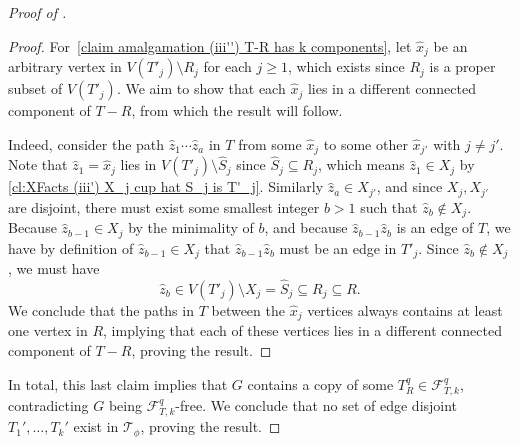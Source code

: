 \documentclass[12pt,letterpaper]{article}
\theoremstyle{definition}
\newcommand{\pow}{q} %
\renewcommand{\c}[1]{\mathcal{#1}}
\newcommand{\sm}{\setminus}
\newcommand{\sub}{\subseteq}
\begin{document}
\begin{proof}[Proof of ]
\begin{proof}
			For~\ref{claim amalgamation (iii'') T-R has k components}, let $\hat{x}_j$ be an arbitrary vertex in $V(T'_j)\sm R_j$ for each $j\ge 1$, which exists since $R_j$ is a proper subset of $V(T'_j)$.  We aim to show that each $\hat{x}_j$ lies in a different connected component of $T-R$, from which the result will follow.  
			
			Indeed, consider the path $\hat{z}_1\cdots \hat{z}_a$ in $T$ from some $\hat{x}_j$ to some other $\hat{x}_{j'}$ with $j\ne j'$.  Note that $\hat{z}_1=\hat{x}_j$ lies in $V(T'_j)\sm \widehat{S}_j$ since $\widehat{S}_j\sub R_j$, which means $\hat{z}_1\in X_j$ by \ref{cl:XFacts (iii') X_j cup hat S_j is T'_j}.  Similarly $\hat{z}_a\in X_{j'}$, and since $X_j,X_{j'}$ are disjoint, there must exist some smallest integer $b>1$ such that $\hat{z}_b\notin X_j$. Because $\hat{z}_{b-1}\in X_j$ by the minimality of $b$, and because $\hat{z}_{b-1}\hat{z}_b$ is an edge of $T$, we have by definition of $\hat{z}_{b-1}\in X_j$ that $\hat{z}_{b-1}\hat{z}_b$ must be an edge in $T'_j$.  Since $\hat{z}_b\notin X_j$, we must have \[\hat{z}_b\in V(T'_j)\sm X_j= \widehat{S}_j\sub R_j\sub R.\]  We conclude  that the paths in $T$ between the $\hat{x}_j$ vertices always contains at least one vertex in $R$, implying that each of these vertices lies in a different connected component of $T-R$, proving the result.
		\end{proof}
		In total, this last claim implies that $G$ contains a copy of some $T_R^\pow\in \c{F}_{T,k}^\pow$, contradicting $G$ being $\c{F}_{T,k}^\pow$-free.  We conclude that no set of edge disjoint $T_1',\ldots,T_k'$ exist in $\c{T}_\phi$, proving the result.
	\end{proof}
	
	
	
\end{document}
